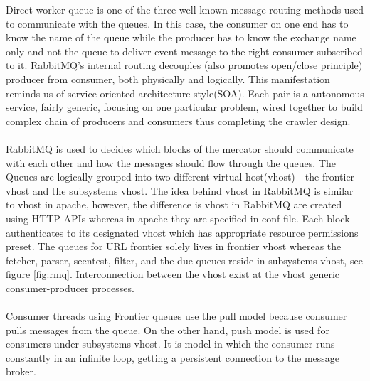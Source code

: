 \noindent
Direct worker queue is one of the three well known message routing methods used to communicate with the
queues. In this case, the consumer on one end has to know the name of the queue while the producer has to know the exchange name only and not the queue to deliver event message to the right consumer subscribed to it.
RabbitMQ's internal routing decouples (also promotes open/close principle) producer from consumer, both physically and logically. This manifestation reminds us of service-oriented architecture style(SOA). Each
pair is a autonomous service, fairly generic, focusing on one particular problem, wired together to build complex chain of producers and consumers thus completing the crawler design.
\\
\\
\noindent
RabbitMQ is used to decides which blocks of the mercator should communicate with each other and how the
messages should flow through the queues. The Queues are logically grouped into two different virtual
host(vhost) - the frontier vhost and the subsystems vhost. The idea behind vhost in RabbitMQ is similar
to vhost in apache, however, the difference is vhost in RabbitMQ are created using HTTP APIs whereas
in apache they are specified in conf file. Each block authenticates to its designated vhost which has
appropriate resource permissions preset. The queues for URL frontier solely lives in frontier vhost
whereas the fetcher, parser, seentest, filter, and the due queues reside in subsystems vhost, see figure
\ref{fig:rmq}. Interconnection between the vhost exist at the vhost generic consumer-producer processes.
\\
\\
\noindent
Consumer threads using Frontier queues use the pull model because consumer pulls messages from the queue.
On the other hand, push model is used for consumers under subsystems vhost. It is model in which the
consumer runs constantly in an infinite loop, getting a persistent connection to the message broker.

\pagebreak

